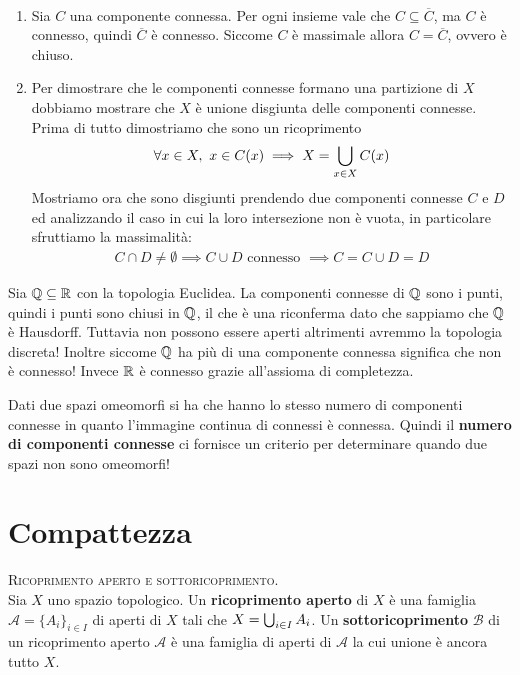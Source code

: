 \begin{demonstration}
	~{}
	\begin{enumerate}[label=\Roman*]
		\item Sia $C$ una componente connessa. Per ogni insieme vale che $C\subseteq\overline{C}$, ma $C$ è connesso, quindi $\overline{C}$ è connesso. Siccome $C$ è massimale allora $C=\overline{C}$, ovvero è chiuso.
		\item Per dimostrare che le componenti connesse formano una partizione di $X$ dobbiamo mostrare che $X$ è unione disgiunta delle componenti connesse. Prima di tutto dimostriamo che sono un ricoprimento
			\begin{equation*}
				\forall x\in X,\ x\in C(x) \implies X=\union_{x\in X}C(x)
			\end{equation*}
		Mostriamo ora che sono disgiunti prendendo due componenti connesse $C$ e $D$ ed analizzando il caso in cui la loro intersezione non è vuota, in particolare sfruttiamo la massimalità:
		\begin{gather*}
			C\cap D\neq\emptyset \implies C\cup D \text{ connesso } \implies C=C\cup D=D
		\end{gather*}
	\end{enumerate}
\vspace{-6mm}
\end{demonstration}
\begin{example}
	Sia $\mathbb{Q}\subseteq\mathbb{R}$ con la topologia Euclidea. La componenti connesse di $\mathbb{Q}$ sono i punti, quindi i punti sono chiusi in $\mathbb{Q}$, il che è una riconferma dato che sappiamo che $\mathbb{Q}$ è Hausdorff. Tuttavia non possono essere aperti altrimenti avremmo la topologia discreta!\newline
	Inoltre siccome $\mathbb{Q}$ ha più di una componente connessa significa che non è connesso! Invece $\mathbb{R}$ è connesso grazie all'assioma di completezza.
\end{example}
\begin{observe}
	Dati due spazi omeomorfi si ha che hanno lo stesso numero di componenti connesse in quanto l'immagine continua di connessi è connessa. Quindi il \textbf{numero di componenti connesse} ci fornisce un criterio per determinare quando due spazi non sono omeomorfi!
\end{observe}


		\section{Compattezza}
\begin{define} \textsc{Ricoprimento aperto e sottoricoprimento.}\\
	Sia $X$ uno spazio topologico. Un \textbf{ricoprimento aperto} di $X$ è una famiglia $\mathcal{A}=\{A_i \}_{i\in I}$ di aperti di $X$ tali che $X=\mathop{{\bigcup}}\displaylimits_{i\in I} A_i$. \newline
	Un \textbf{sottoricoprimento} $\mathcal{B}$ di un ricoprimento aperto $\mathcal{A}$ è una famiglia di aperti di $\mathcal{A}$ la cui unione è ancora tutto $X$.
\end{define}		

